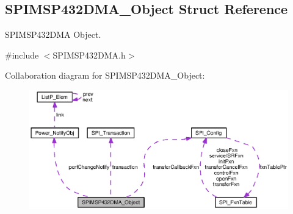 \subsection{S\+P\+I\+M\+S\+P432\+D\+M\+A\+\_\+\+Object Struct Reference}
\label{struct_s_p_i_m_s_p432_d_m_a___object}


S\+P\+I\+M\+S\+P432\+D\+M\+A Object.  




{\ttfamily \#include $<$S\+P\+I\+M\+S\+P432\+D\+M\+A.\+h$>$}



Collaboration diagram for S\+P\+I\+M\+S\+P432\+D\+M\+A\+\_\+\+Object\+:
\nopagebreak
\begin{figure}[H]
\begin{center}
\leavevmode
\includegraphics[width=350pt]{struct_s_p_i_m_s_p432_d_m_a___object__coll__graph}
\end{center}
\end{figure}
